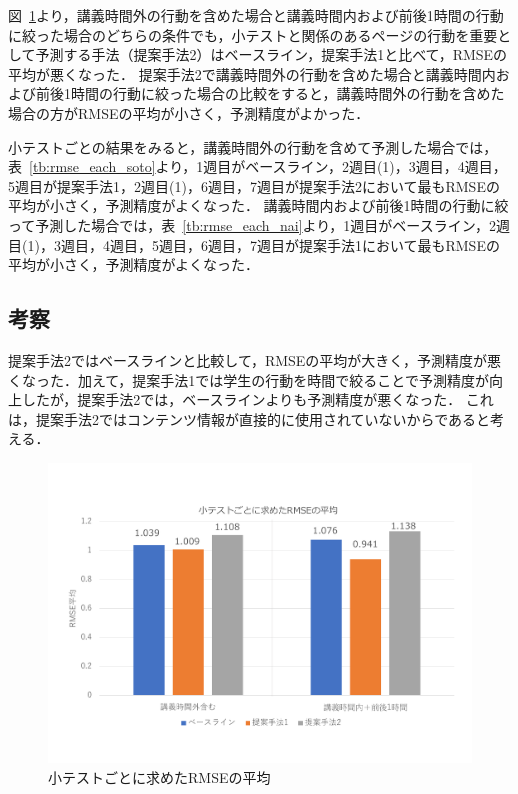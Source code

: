 \documentclass[a4paper,12pt]{ltjsreport}
\begin{document}
図~\ref{fig:rmse_2}より，講義時間外の行動を含めた場合と講義時間内および前後1時間の行動に絞った場合のどちらの条件でも，小テストと関係のあるページの行動を重要として予測する手法（提案手法2）はベースライン，提案手法1と比べて，RMSEの平均が悪くなった．
提案手法2で講義時間外の行動を含めた場合と講義時間内および前後1時間の行動に絞った場合の比較をすると，講義時間外の行動を含めた場合の方がRMSEの平均が小さく，予測精度がよかった．

小テストごとの結果をみると，講義時間外の行動を含めて予測した場合では，表~\ref{tb:rmse_each_soto}より，1週目がベースライン，2週目(1)，3週目，4週目，5週目が提案手法1，2週目(1)，6週目，7週目が提案手法2において最もRMSEの平均が小さく，予測精度がよくなった．
講義時間内および前後1時間の行動に絞って予測した場合では，表~\ref{tb:rmse_each_nai}より，1週目がベースライン，2週目(1)，3週目，4週目，5週目，6週目，7週目が提案手法1において最もRMSEの平均が小さく，予測精度がよくなった．

\subsection{考察}
提案手法2ではベースラインと比較して，RMSEの平均が大きく，予測精度が悪くなった．加えて，提案手法1では学生の行動を時間で絞ることで予測精度が向上したが，提案手法2では，ベースラインよりも予測精度が悪くなった．
これは，提案手法2ではコンテンツ情報が直接的に使用されていないからであると考える．


\begin{figure}[tbp]
  \centering
  \includegraphics[scale = 0.4]{RMSE_3.pdf}
  \vspace{-10mm}
  \caption{小テストごとに求めたRMSEの平均}
  \label{fig:rmse_2}
\end{figure}
\end{document}
